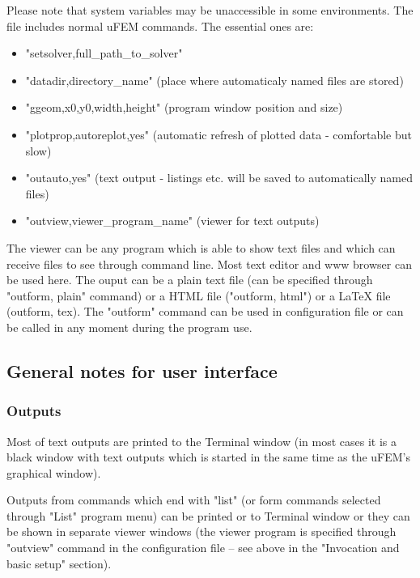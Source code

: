 \documentclass{article}
\begin{document}
 Please note that system variables may be unaccessible in
 some environments.
 The file includes normal uFEM commands. The essential ones are:


\begin{itemize}
\item  "setsolver,full\_path\_to\_solver"
\item  "datadir,directory\_name" (place where automaticaly named files are stored)
\item  "ggeom,x0,y0,width,height" (program window position and size)
\item  "plotprop,autoreplot,yes" (automatic refresh of plotted data - comfortable but slow)
\item  "outauto,yes" (text output - listings etc. will be saved to automatically named files)
\item  "outview,viewer\_program\_name" (viewer for text outputs)
\end{itemize}

 The viewer can be any program which is able to show text
 files and which can receive files to see through command
 line. Most text editor and www browser can be used here.
 The ouput can be a plain text file (can be specified
 through "outform, plain" command) or a HTML file ("outform,
 html") or a LaTeX file (outform, tex). The "outform" command
 can be used in configuration file or can be called in any
 moment during the program use.



\subsection{General notes for user interface}

\subsubsection{Outputs}

 Most of text outputs are printed to the Terminal window (in most
 cases it is a black window with text outputs which is started
 in the same time as the uFEM's graphical window).

 Outputs from commands which end with "list" (or form
 commands selected through "List" program menu) can be
 printed or to Terminal window or they can be shown in
 separate viewer windows (the viewer program is specified
 through "outview" command in the configuration file -- see
 above in the "Invocation and basic setup" section).
\end{document}
